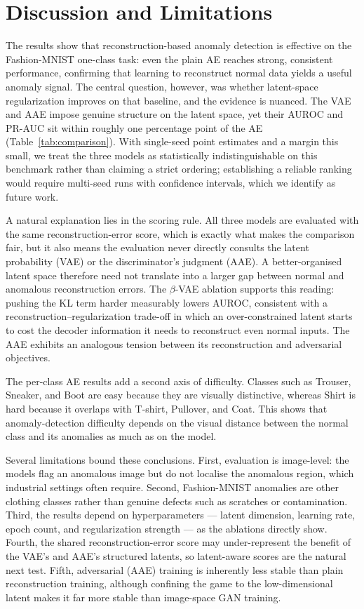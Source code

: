 \documentclass[11pt]{article}
\begin{document}
\section{Discussion and Limitations}   %
The results show that reconstruction-based anomaly detection is effective on the
Fashion-MNIST one-class task: even the plain AE reaches strong, consistent
performance, confirming that learning to reconstruct normal data yields a useful
anomaly signal. The central question, however, was whether latent-space
regularization improves on that baseline, and the evidence is nuanced. The VAE
and AAE impose genuine structure on the latent space, yet their AUROC and PR-AUC
sit within roughly one percentage point of the AE (Table~\ref{tab:comparison}).
With single-seed point estimates and a margin this small, we treat the three
models as statistically indistinguishable on this benchmark rather than claiming
a strict ordering; establishing a reliable ranking would require multi-seed runs
with confidence intervals, which we identify as future work.

A natural explanation lies in the scoring rule. All three models are evaluated
with the same reconstruction-error score, which is exactly what makes the
comparison fair, but it also means the evaluation never directly consults the
latent probability (VAE) or the discriminator's judgment (AAE). A better-organised
latent space therefore need not translate into a larger gap between normal and
anomalous reconstruction errors. The $\beta$-VAE ablation supports this reading:
pushing the KL term harder measurably lowers AUROC, consistent with a
reconstruction--regularization trade-off in which an over-constrained latent
starts to cost the decoder information it needs to reconstruct even normal inputs.
The AAE exhibits an analogous tension between its reconstruction and adversarial
objectives.

The per-class AE results add a second axis of difficulty. Classes such as
Trouser, Sneaker, and Boot are easy because they are visually distinctive, whereas
Shirt is hard because it overlaps with T-shirt, Pullover, and Coat. This shows
that anomaly-detection difficulty depends on the visual distance between the
normal class and its anomalies as much as on the model.

Several limitations bound these conclusions. First, evaluation is image-level: the
models flag an anomalous image but do not localise the anomalous region, which
industrial settings often require. Second, Fashion-MNIST anomalies are other
clothing classes rather than genuine defects such as scratches or contamination.
Third, the results depend on hyperparameters --- latent dimension, learning rate,
epoch count, and regularization strength --- as the ablations directly show.
Fourth, the shared reconstruction-error score may under-represent the benefit of
the VAE's and AAE's structured latents, so latent-aware scores are the natural
next test. Fifth, adversarial (AAE) training is inherently less stable than plain
reconstruction training, although confining the game to the low-dimensional latent
makes it far more stable than image-space GAN training.
\end{document}
